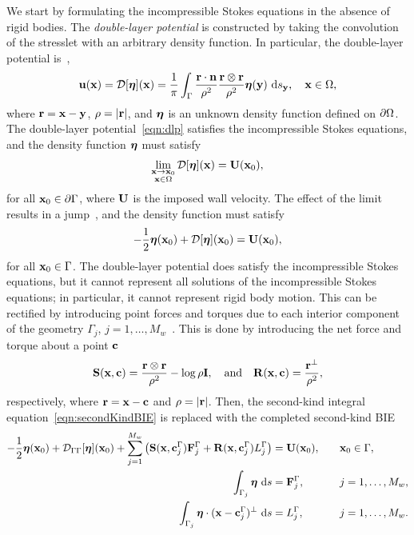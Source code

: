 \documentclass[preprint, 10pt]{elsarticle}
\begin{document}
We start by formulating the incompressible Stokes equations in the
absence of rigid bodies.  The {\em double-layer potential} is
constructed by taking the convolution of the stresslet with an arbitrary
density function.  In particular, the double-layer potential
is~\cite{Ladyzhenskaya1963, Pozrikidis1992},
\begin{align}
  \label{eqn:dlp}
  {\mathbf{u}}({\mathbf{x}}) = {\mathcal{D}}[{\boldsymbol\eta}]({\mathbf{x}}) = \frac{1}{\pi}\int_{\Gamma}
  \frac{{\mathbf{r}}\cdot\mathbf{n}}{\rho^2}\frac{{\mathbf{r}} \otimes {\mathbf{r}}}{\rho^2}
  {\boldsymbol\eta}({\mathbf{y}})~\text{d}s_{{\mathbf{y}}}, \quad {\mathbf{x}} \in \Omega,
\end{align}
where ${\mathbf{r}} = {\mathbf{x}} - {\mathbf{y}}$, $\rho=|{\mathbf{r}}|$, and ${\boldsymbol\eta}$ is an unknown density
function defined on ${\partial}\Omega$.  The double-layer
potential~\eqref{eqn:dlp} satisfies the incompressible Stokes equations,
and the density function ${\boldsymbol\eta}$ must satisfy
\begin{align*}
  \lim_{\substack{{\mathbf{x}} \rightarrow {\mathbf{x}}_0 \\ {\mathbf{x}} \in \Omega}}
    {\mathcal{D}}[{\boldsymbol\eta}]({\mathbf{x}}) = {\mathbf{U}}({\mathbf{x}}_0),
\end{align*}
for all ${\mathbf{x}}_0 \in {\partial}\Gamma$, where ${\mathbf{U}}$ is the imposed wall velocity.
The effect of the limit results in a jump~\cite{Pozrikidis1992}, and the
density function must satisfy  
\begin{align}
  -\frac{1}{2} {\boldsymbol\eta}({\mathbf{x}}_0) + {\mathcal{D}}[{\boldsymbol\eta}]({\mathbf{x}}_0) = {\mathbf{U}}({\mathbf{x}}_0),
  \label{eqn:secondKindBIE}
\end{align}
for all ${\mathbf{x}}_0 \in \Gamma$.  The double-layer potential does satisfy the
incompressible Stokes equations, but it cannot represent all solutions
of the incompressible Stokes equations; in particular, it cannot
represent rigid body motion.  This can be rectified by introducing point
forces and torques due to each interior component of the geometry
$\Gamma_j$, $j = 1,\ldots,M_w$~\cite{Power1987, Power1993}.  This is
done by introducing the net force and torque about a point ${\mathbf{c}}$
\begin{align*}
  \mathbf{S}({\mathbf{x}},{\mathbf{c}}) = \frac{{\mathbf{r}} \otimes {\mathbf{r}}}{\rho^2} - 
  \log\rho\mathbf{I}, \quad \text{and} \quad
  \mathbf{R}({\mathbf{x}},{\mathbf{c}}) = \frac{{\mathbf{r}}^\perp}{\rho^2},
\end{align*}
respectively, where ${\mathbf{r}} = {\mathbf{x}} - {\mathbf{c}}$ and $\rho = |{\mathbf{r}}|$.  Then, the
second-kind integral equation~\eqref{eqn:secondKindBIE} is replaced with
the completed second-kind BIE
\begin{equation}
  \label{eq:completed_DLP}
  \begin{split}
  -\frac{1}{2}{\boldsymbol\eta}({\mathbf{x}}_0) + {\mathcal{D}}_{\Gamma\Gamma}[{\boldsymbol\eta}]({\mathbf{x}}_0) + 
    \sum_{j=1}^{M_w} \left(\mathbf{S}({\mathbf{x}},{\mathbf{c}}^\Gamma_j){\mathbf{F}}^\Gamma_j + 
      \mathbf{R}({\mathbf{x}},{\mathbf{c}}^\Gamma_j)L^\Gamma_j\right) &= {\mathbf{U}}({\mathbf{x}}_0),
      \quad &&{\mathbf{x}}_0 \in \Gamma, \\
  \int_{\Gamma_j} {\boldsymbol\eta}~\text{d}s &= {\mathbf{F}}^\Gamma_j, 
      &&j=1,\ldots,M_w, \\
  \int_{\Gamma_j} {\boldsymbol\eta}\cdot ({\mathbf{x}} - {\mathbf{c}}^\Gamma_j)^\perp~\text{d}s &=   
      L^\Gamma_j, &&j=1,\ldots,M_w.
  \end{split}
\end{equation}
\end{document}
